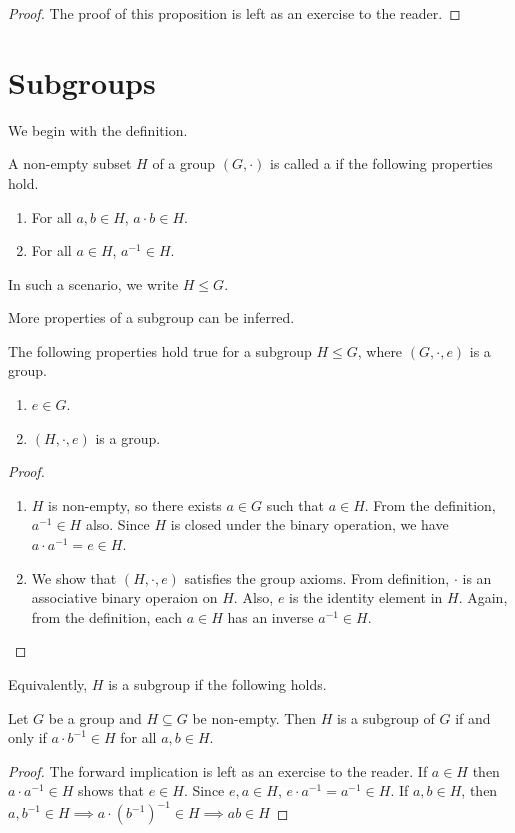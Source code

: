 \begin{proof}
    The proof of this proposition is left as an exercise to the reader.
\end{proof}


\section{Subgroups}

We begin with the definition.

\begin{definition}
    A non-empty subset $H$ of a group $(G,\cdot)$ is called a  if the following properties hold.
    \begin{enumerate}
        \item For all $a,b \in H$, $a \cdot b \in H$.
        \item For all $a \in H$, $a^{-1} \in H$.
    \end{enumerate}
    In such a scenario, we write $H \leqslant G$.
\end{definition}

More properties of a subgroup can be inferred.

\begin{proposition}
    The following properties hold true for a subgroup $H \leqslant G$, where $(G,\cdot,e)$ is a group.
    \begin{enumerate}
        \item $e \in G$.
        \item $(H,\cdot,e)$ is a group.
    \end{enumerate}
\end{proposition}

\begin{proof}
    \begin{enumerate}
        \item $H$ is non-empty, so there exists $a \in G$ such that $a \in H$. From the definition, $a^{-1} \in H$ also. Since $H$ is closed under the binary operation, we have $a \cdot a^{-1} = e \in H$.
        
        \item We show that $(H,\cdot,e)$ satisfies the group axioms. From definition, $\cdot$ is an associative binary operaion on $H$. Also, $e$ is the identity element in $H$. Again, from the definition, each $a \in H$ has an inverse $a^{-1} \in H$.
    \end{enumerate}
\end{proof}

Equivalently, $H$ is a subgroup if the following holds.

\begin{theorem}
    Let $G$ be a group and $H \subseteq G$ be non-empty. Then $H$ is a subgroup of $G$ if and only if $a \cdot b^{-1} \in H$ for all $a,b \in H$.
\end{theorem}
\begin{proof}
    The forward implication is left as an exercise to the reader. If $a \in H$ then $a \cdot a^{-1} \in H$ shows that $e \in H$. Since $e,a \in H$, $e \cdot a^{-1} = a^{-1} \in H$. If $a,b \in H$, then $a,b^{-1} \in H \implies a \cdot (b^{-1})^{-1} \in H \implies ab \in H$
\end{proof}